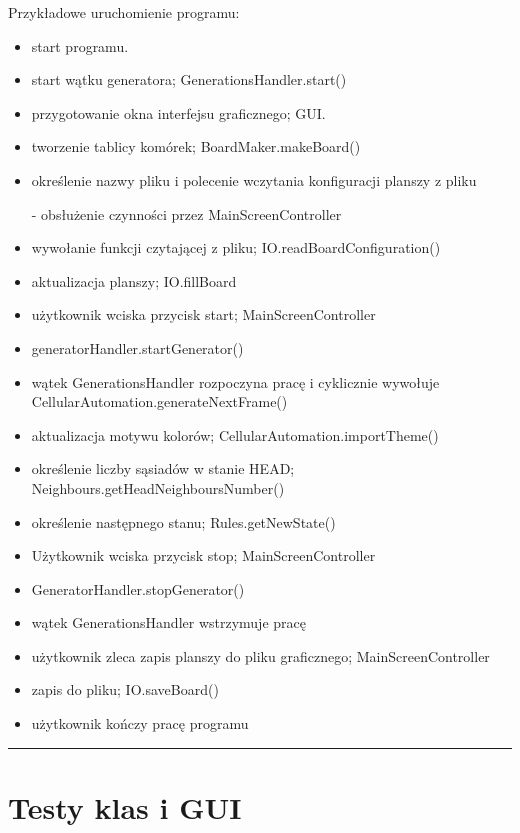 \documentclass[a4paper,11pt]{article}
\newcommand{\linia}{\rule{\linewidth}{0.4mm}}
\begin{document}
Przykładowe uruchomienie programu:
\begin{itemize}
\item start programu. 
\item start wątku generatora; GenerationsHandler.start()
\item przygotowanie okna interfejsu graficznego; GUI.
\item tworzenie tablicy komórek; BoardMaker.makeBoard()
\item określenie nazwy pliku i polecenie wczytania konfiguracji planszy z pliku 

- obsłużenie czynności przez MainScreenController
\item wywołanie funkcji czytającej z pliku; IO.readBoardConfiguration()
\item aktualizacja planszy; IO.fillBoard
\item użytkownik wciska przycisk start; MainScreenController
\item generatorHandler.startGenerator()
\item wątek GenerationsHandler rozpoczyna pracę i cyklicznie wywołuje CellularAutomation.generateNextFrame()
\item aktualizacja motywu kolorów; CellularAutomation.importTheme()
\item określenie liczby sąsiadów w stanie HEAD; Neighbours.getHeadNeighboursNumber()
\item określenie następnego stanu; Rules.getNewState()
\item Użytkownik wciska przycisk stop; MainScreenController
\item GeneratorHandler.stopGenerator()
\item wątek GenerationsHandler wstrzymuje pracę
\item użytkownik zleca zapis planszy do pliku graficznego; MainScreenController
\item zapis do pliku; IO.saveBoard()
\item użytkownik kończy pracę programu
\end{itemize}


\noindent\linia
\section{Testy klas i GUI}
\end{document}

